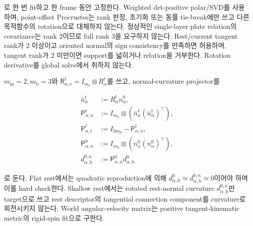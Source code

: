 \documentclass[11pt,a4paper]{article}
\begin{document}
로 한 번 fit하고 한 frame 동안 고정한다.
Weighted det-positive polar/SVD를 사용하며, point-offset Procrustes는 rank 판정, 초기화 또는
동률 tie-break에만 쓰고 다른 목적함수의 rotation으로 대체하지 않는다.
정상적인 single-layer plate relation의 covariance는 rank 2이므로
full rank 3을 요구하지 않는다. Rest/current tangent rank가 2 이상이고 oriented normal의
sign consistency를 만족하면 허용하며, tangent rank가 2 미만이면 support를 넓히거나 relation을 거부한다.
Rotation derivative를 global solve에서 취하지 않는다.

\(m_{\mathrm m}=2,m_{\mathrm b}=3\)와
\(\mathsf R_{\alpha,c}^t=I_{m_c}\otimes R_\alpha^t\)를 쓰고,
normal-curvature projector를

\begin{equation}
\begin{aligned}
  \bar n_\alpha^t&:=R_\alpha^tn_\alpha^0,\\
  \mathsf P_{\alpha,n}^t
  &:={}I_{m_{\mathrm b}}\otimes
  (\bar n_\alpha^t(\bar n_\alpha^t)^\top),\\
  \mathsf P_{\alpha,t}^t&:=I_{3m_{\mathrm b}}-\mathsf P_{\alpha,n}^t,\\
  \mathsf P_{\alpha,n}^0
  &:={}I_{m_{\mathrm b}}\otimes(n_\alpha^0(n_\alpha^0)^\top),\\
  d_{\alpha,\mathrm b}^{0,n}
  &:=\mathsf P_{\alpha,n}^0d_{\alpha,\mathrm b}^0
  \label{eq:bending-normal-projectors}
\end{aligned}
\end{equation}

로 둔다. Flat rest에서는 quadratic reproduction에 의해
\(d_{\alpha,\mathrm b}^0\simeq d_{\alpha,\mathrm b}^{0,n}\simeq0\)이어야 하며 이를 hard check한다.
Shallow rest에서는 rotated rest-normal curvature \(d_{\alpha,\mathrm b}^{0,n}\)만 target으로 쓰고
rest descriptor의 tangential connection component를 curvature로 회전시키지 않는다.
World angular-velocity matrix는 positive tangent-kinematic metric의 rigid-spin fit으로 구한다.
\end{document}
